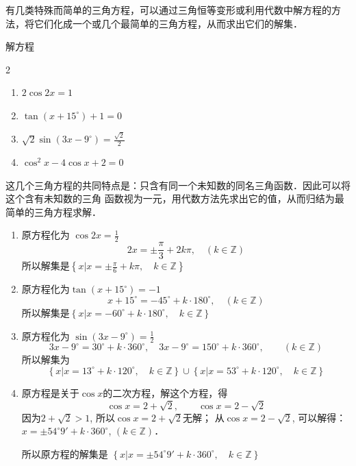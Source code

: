 有几类特殊而简单的三角方程，可以通过三角恒等变形或利用代数中解方程的方法，将它们化成一个或几个最简单的三角方程，从而求出它们的解集．

\begin{example}
    解方程
\begin{multicols}{2}
\begin{enumerate}
\item $2\cos2x=1$
\item $\tan (x+15^{\circ})+1=0$
\item $\sqrt{2}\sin(3x-9^{\circ})=\frac{\sqrt{2}}{2}$
\item $\cos^2x-4\cos x+2=0$
\end{enumerate}
\end{multicols}
\end{example}

\begin{analyze}
  这几个三角方程的共同特点是：只含有同一个未知数的同名三角函数．因此可以将这个含有未知数的三角  
  函数视为一元，用代数方法先求出它的值，从而归结为最简单的三角方程求解．
\end{analyze}

\begin{solution}
 \begin{enumerate}
     \item 原方程化为 $\cos 2x=\frac{1}{2}$
\[2x=\pm\frac{\pi}{3}+2k\pi,\quad (k\in\mathbb{Z})\] 
所以解集是$\left\{x\Big|x=\pm\frac{\pi}{6}+k\pi,\quad k\in\mathbb{Z}\right\}$
\item  原方程化为$\tan(x+15^{\circ})=-1$
\[x+15^{\circ}=-45^{\circ}+k\cdot 180^{\circ},\quad (k\in\mathbb{Z})\]
所以解集是$\left\{x\Big|x=-60^{\circ}+k\cdot 180^{\circ},\quad k\in\mathbb{Z}\right\}$
\item 原方程化为 $\sin(3x-9^{\circ})=\frac{1}{2}$
\[3x-9^{\circ}=30^{\circ}+k\cdot 360^{\circ},\quad 3x-9^{\circ}=150^{\circ}+k\cdot 360^{\circ},\qquad (k\in\mathbb{Z})\]
所以解集为$$\left\{x\Big|x=13^{\circ}+k\cdot 120^{\circ},\quad k\in\mathbb{Z}\right\}\cup \left\{x\Big|x=53^{\circ}+k\cdot 120^{\circ},\quad k\in\mathbb{Z}\right\}$$
\item 原方程是关于$\cos x$的二次方程，解这个方程，得
\[\cos x=2+\sqrt{2},\qquad \cos x=2-\sqrt{2}\]
因为$2+\sqrt{2}>1$, 所以$\cos x=2+\sqrt{2}$无解；
从$\cos x=2-\sqrt{2}$, 可以解得：$x=\pm 54^{\circ}9'+k\cdot 360^{\circ}$, $(k\in\mathbb{Z})$．

所以原方程的解集是
$\left\{x\Big|x=\pm 54^{\circ}9'+k\cdot 360^{\circ},\quad k\in\mathbb{Z}\right\}$
 \end{enumerate}  
\end{solution}

